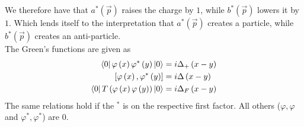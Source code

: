 \documentclass{report}
\begin{document}
We therefore have that $a^{*} \left( \vec{p} \right) $ raises the charge by $1$, while $b^{*} \left( \vec{p} \right) $ lowers it by $1$. Which lends itself to the interpretation that $a^{*} \left( \vec{p} \right) $ creates a particle, while $b^{*} \left( \vec{p} \right) $ creates an anti-particle.\\
The Green's functions are given as
\begin{align*}
  \bra{0} \varphi\left( x \right) \varphi^{*} \left( y \right) \ket{0} &= i \Delta_+\left( x-y \right)  \\
  \left[ \varphi\left( x \right) , \varphi^{*} \left( y \right)  \right] &= i \Delta\left( x-y \right)  \\
  \bra{0} T\left( \varphi\left( x \right) \varphi\left( y \right)  \right) \ket{0} &= i \Delta_F \left( x-y \right)
\end{align*}
The same relations hold if the $^{*} $ is on the respective first factor. All others ($\varphi, \varphi$ and $\varphi^{*} , \varphi^{*} $) are $0$.
\end{document}
